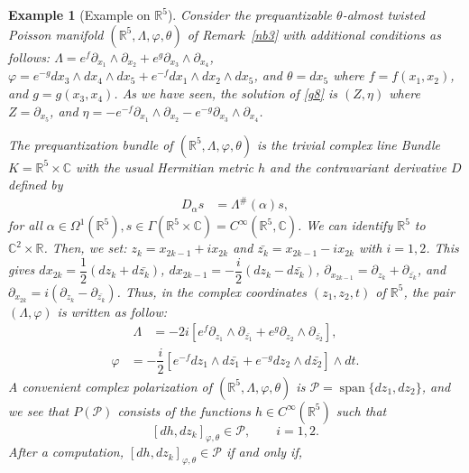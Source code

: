 \documentclass[a4paper,10pt]{article}
\numberwithin{equation}{section}
\theoremstyle{plain}
\newtheorem{remark}[theorem]{Remark}
\newtheorem{example}{Example}
\begin{document}
	
	
	
	\begin{example}[Example on $\mathbb{R}^5$]
	Consider the prequantizable  $\theta$-almost twisted Poisson manifold $(\mathbb{R}^5,\Lambda,\varphi,\theta)$ of Remark~\ref{nb3} with additional conditions as follows:
	$\Lambda = e^f\partial_{x_1}\wedge\partial_{x_2}+e^g\partial_{x_3}\wedge\partial_{x_4}$,
	$\varphi = e^{-g}d{x_3}\wedge d{x_4}\wedge d{x_5}+e^{-f}d{x_1}\wedge d{x_2}\wedge d{x_5}$, and  $\theta = dx_5$
	where $f=f(x_1,x_2)$, and $g=g(x_3,x_4)$.  As we have seen, the solution of \eqref{g8} is $(Z,\eta)$ where
	$Z=\partial_{x_5}$, and $\eta=-e^{-f}\partial_{x_1}\wedge\partial_{x_2}-e^{-g}\partial_{x_3}\wedge\partial_{x_4}$.
	
	The prequantization bundle  of $(\mathbb{R}^5,\Lambda,\varphi,\theta)$ is the trivial complex line Bundle
	$K = \mathbb{R}^5 \times \mathbb{C}$ with the usual Hermitian metric $h$ and the contravariant derivative $D$ defined by
	\begin{align}\label{nb5}
	D_\alpha s &= \Lambda^\#(\alpha)s,
	\end{align}
	for all $\alpha\in \Omega^1(\mathbb{R}^5),s\in\Gamma(\mathbb{R}^5\times\mathbb{C})=C^\infty(\mathbb{R}^5,\mathbb{C})$.
	We can identify $\mathbb{R}^5$ to $\mathbb{C}^2\times\mathbb{R}$. Then, we set:  $z_k=x_{2k-1}+ix_{2k}$ and $\bar{z_k}=x_{2k-1}-ix_{2k}$   with $i=1,2$.
	This gives  $dx_{2k}=\dfrac{1}{2}(dz_k+d\bar{z_k})$,  $dx_{2k-1}=-\dfrac{i}{2}(dz_k-d\bar{z_k})$, $\partial_{x_{2k-1}}=\partial_{z_{k}}+
	\partial_{\bar{z_{k}}}$, and $\partial_{x_{2k}}=i(\partial_{z_{k}}-
	\partial_{\bar{z_{k}}})$. Thus, in the complex coordinates $(z_1,z_2,t)$ of $\mathbb{R}^5$, the pair $(\Lambda,\varphi)$ is written as follow:
	\begin{align*}
	\Lambda&=-2i[e^f\partial_{z_1}\wedge\partial_{\bar{z_1}}+e^g\partial_{z_2}\wedge\partial_{\bar{z_2}}],
	\end{align*}
	\begin{align*}
	\varphi&=-\dfrac{i}{2}[e^{-f}dz_1\wedge d\bar{z_1}+e^{-g}dz_2\wedge d\bar{z_2}]\wedge dt.
	\end{align*}
	A convenient complex polarization  of $(\mathbb{R}^5,\Lambda,\varphi,\theta)$ is  $\mathcal{P} = \operatorname{span}\{ dz_1,dz_2 \}$,
	and we see that  $P(\mathcal{P})$ consists of the functions $h\in C^\infty(\mathbb{R}^5)$ such that
	$$[dh,dz_k]_{\varphi,\theta}\in \mathcal{P},\quad\quad i=1,2.$$  After a computation, $[dh,dz_k]_{\varphi,\theta}\in \mathcal{P}$ if and only if,

\end{example}
\end{document}
